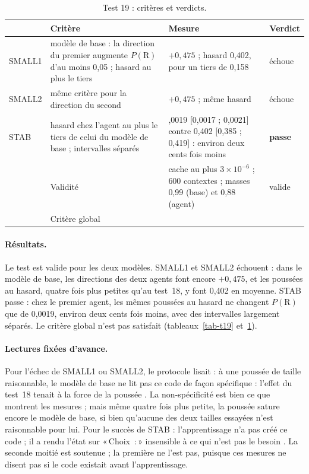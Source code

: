 \documentclass[11pt,a4paper]{article}
\newcommand{\passe}{\textbf{passe}}
\newcommand{\Choix}{«\,Choix~:\,»}
\begin{document}
\begin{table}[t]
\centering
\caption{Test 19 : critères et verdicts.}
\label{tab-t19v}
\small
\begin{tabularx}{\textwidth}{@{}l >{\raggedright\arraybackslash}X >{\raggedright\arraybackslash}X l@{}}
\toprule
& Critère & Mesure & Verdict \\
\midrule
SMALL1 & modèle de base : la direction du premier augmente $P(\mathrm R)$ d'au moins 0,05 ; hasard au plus le tiers & $+0,475$ ; hasard 0,402, pour un tiers de 0,158 & échoue \\
SMALL2 & même critère pour la direction du second & $+0,475$ ; même hasard & échoue \\
STAB & hasard chez l'agent au plus le tiers de celui du modèle de base ; intervalles séparés & 0,0019 [0,0017 ; 0,0021] contre 0,402 [0,385 ; 0,419] : environ deux cents fois moins & \passe \\
& Validité & cache au plus $3\times10^{-6}$ ; 600 contextes ; masses 0,99 (base) et 0,88 (agent) & valide \\
\midrule
& Critère global & \multicolumn{2}{l}{non satisfait (SMALL1, SMALL2)} \\
\bottomrule
\end{tabularx}
\end{table}

\paragraph{Résultats.} Le test est valide pour les deux modèles. SMALL1 et SMALL2 échouent :
dans le modèle de base, les directions des deux agents font encore $+0,475$, et les poussées au
hasard, quatre fois plus petites qu'au test~18, y font 0,402 en moyenne. STAB passe : chez le
premier agent, les mêmes poussées au hasard ne changent $P(\mathrm R)$ que de 0,0019, environ
deux cents fois moins, avec des intervalles largement séparés. Le critère global n'est pas
satisfait (tableaux~\ref{tab-t19} et~\ref{tab-t19v}).

\paragraph{Lectures fixées d'avance.} Pour l'échec de SMALL1 ou SMALL2, le protocole lisait :
\og à une poussée de taille raisonnable, le modèle de base ne lit pas ce code de façon
spécifique : l'effet du test~18 tenait à la force de la poussée \fg{}. La non-spécificité est
bien ce que montrent les mesures ; mais même quatre fois plus petite, la poussée sature encore
le modèle de base, si bien qu'aucune des deux tailles essayées n'est \og raisonnable \fg{} pour
lui. Pour le succès de STAB : \og l'apprentissage n'a pas créé ce code ; il a rendu l'état sur
\Choix{} insensible à ce qui n'est pas le besoin \fg{}. La seconde moitié est soutenue ; la
première ne l'est pas, puisque ces mesures ne disent pas si le code existait avant
l'apprentissage.
\end{document}
